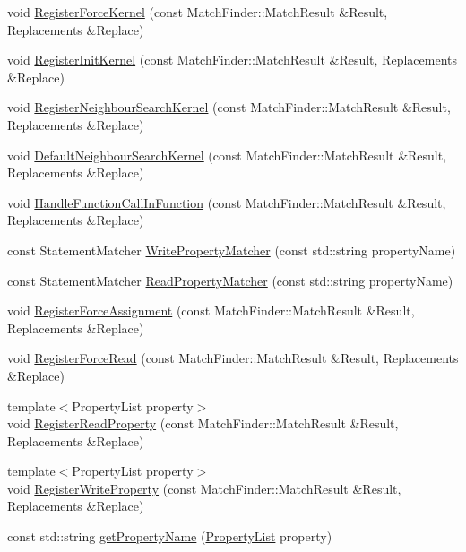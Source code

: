 \begin{DoxyCompactItemize}
void \mbox{\hyperlink{namespacews2st_1_1dependency__detection_a4db008944a7455244b81941a7b0efc2b}{Register\+Force\+Kernel}} (const Match\+Finder\+::\+Match\+Result \&Result, Replacements \&Replace)
\item 
void \mbox{\hyperlink{namespacews2st_1_1dependency__detection_ae32a6dbe890421b635bdb1a91728a7fb}{Register\+Init\+Kernel}} (const Match\+Finder\+::\+Match\+Result \&Result, Replacements \&Replace)
\item 
void \mbox{\hyperlink{namespacews2st_1_1dependency__detection_a248d3b13235071779b21013154238667}{Register\+Neighbour\+Search\+Kernel}} (const Match\+Finder\+::\+Match\+Result \&Result, Replacements \&Replace)
\item 
void \mbox{\hyperlink{namespacews2st_1_1dependency__detection_af3f0299c83e5f9608d8086fe50abf81c}{Default\+Neighbour\+Search\+Kernel}} (const Match\+Finder\+::\+Match\+Result \&Result, Replacements \&Replace)
\item 
void \mbox{\hyperlink{namespacews2st_1_1dependency__detection_a38357d8dfb24ccbc3e38b73868bcdaec}{Handle\+Function\+Call\+In\+Function}} (const Match\+Finder\+::\+Match\+Result \&Result, Replacements \&Replace)
\item 
const Statement\+Matcher \mbox{\hyperlink{namespacews2st_1_1dependency__detection_a0d8350273a214bbd4586dedadf37ab83}{Write\+Property\+Matcher}} (const std\+::string property\+Name)
\item 
const Statement\+Matcher \mbox{\hyperlink{namespacews2st_1_1dependency__detection_aa8821ec3e79b7058ff4ac29b7b5a8374}{Read\+Property\+Matcher}} (const std\+::string property\+Name)
\item 
void \mbox{\hyperlink{namespacews2st_1_1dependency__detection_ac7eb92a60458dc08ec4dc7267637cf78}{Register\+Force\+Assignment}} (const Match\+Finder\+::\+Match\+Result \&Result, Replacements \&Replace)
\item 
void \mbox{\hyperlink{namespacews2st_1_1dependency__detection_a9c04a597c5b86be1c0b3c98b61ef3f8d}{Register\+Force\+Read}} (const Match\+Finder\+::\+Match\+Result \&Result, Replacements \&Replace)
\item 
{\footnotesize template$<$Property\+List property$>$ }\\void \mbox{\hyperlink{namespacews2st_1_1dependency__detection_aa071e67a31629c2fff6e3d16a9eed42d}{Register\+Read\+Property}} (const Match\+Finder\+::\+Match\+Result \&Result, Replacements \&Replace)
\item 
{\footnotesize template$<$Property\+List property$>$ }\\void \mbox{\hyperlink{namespacews2st_1_1dependency__detection_a37100c3e1b7e8038aff533d343905484}{Register\+Write\+Property}} (const Match\+Finder\+::\+Match\+Result \&Result, Replacements \&Replace)
\item 
const std\+::string \mbox{\hyperlink{namespacews2st_1_1dependency__detection_aa7715a6e777bd59ab78718644a58b1fa}{get\+Property\+Name}} (\mbox{\hyperlink{namespacews2st_1_1dependency__detection_abcddd986f080a9e5c494edfad3c3faf7}{Property\+List}} property)
\end{DoxyCompactItemize}
